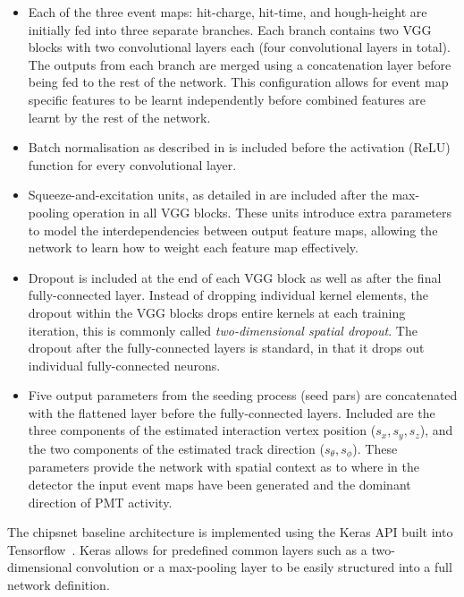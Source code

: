 \begin{itemize}
    \item Each of the three event maps: hit-charge, hit-time, and hough-height are initially fed
          into three separate branches. Each branch contains two VGG blocks with two convolutional
          layers each (four convolutional layers in total). The outputs from each branch are
          merged using a concatenation layer before being fed to the rest of the network. This
          configuration allows for event map specific features to be learnt independently before
          combined features are learnt by the rest of the network.

    \item Batch normalisation as described in  is included before
          the activation (ReLU) function for every convolutional layer.

    \item Squeeze-and-excitation units, as detailed in  are included after
          the max-pooling operation in all VGG blocks. These units introduce extra parameters to
          model the interdependencies between output feature maps, allowing the network to learn
          how to weight each feature map effectively.

    \item Dropout is included at the end of each VGG block as well as after the final
          fully-connected layer. Instead of dropping individual kernel elements, the dropout
          within the VGG blocks drops entire kernels at each training iteration, this is commonly
          called \emph{two-dimensional spatial dropout}. The dropout after the fully-connected
          layers is standard, in that it drops out individual fully-connected neurons.

    \item Five output parameters from the seeding process (seed pars) are concatenated with the
          flattened layer before the fully-connected layers. Included are the three components of
          the estimated interaction vertex position ($s_{x},s_{y}, s_{z}$), and the two components
          of the estimated track direction ($s_{\theta},s_{\phi}$). These parameters provide the
          network with spatial context as to where in the detector the input event maps have been
          generated and the dominant direction of PMT activity.
\end{itemize}

The chipsnet baseline architecture is implemented using the Keras API built into
Tensorflow~\cite{chollet2015}. Keras allows for predefined common layers such as a two-dimensional
convolution or a max-pooling layer to be easily structured into a full network definition.


